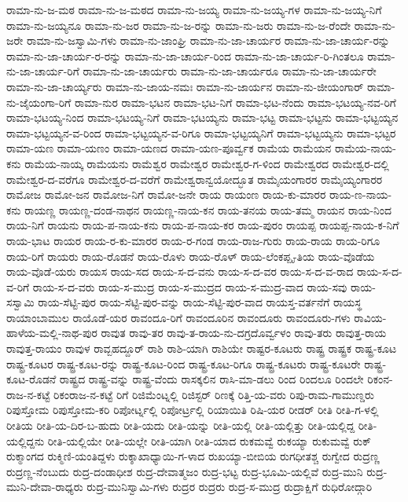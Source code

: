 ರಾಮಾ-ನು-ಜ-ಮಠ
ರಾಮಾ-ನು-ಜ-ಮಠದ
ರಾಮಾ-ನು-ಜಯ್ಯ
ರಾಮಾ-ನು-ಜಯ್ಯ-ಗಳ
ರಾಮಾ-ನು-ಜಯ್ಯ-ನಿಗೆ
ರಾಮಾ-ನು-ಜಯ್ಯನೂ
ರಾಮಾ-ನು-ಜರ
ರಾಮಾ-ನು-ಜ-ರನ್ನು
ರಾಮಾ-ನು-ಜರು
ರಾಮಾ-ನು-ಜ-ರೆಂದೇ
ರಾಮಾ-ನು-ಜರೇ
ರಾಮಾ-ನು-ಜಸ್ವಾಮಿ-ಗಳು
ರಾಮಾ-ನು-ಜಾಂಘ್ರಿ
ರಾಮಾ-ನು-ಜಾ-ಚಾರ್ಯರ
ರಾಮಾ-ನು-ಜಾ-ಚಾರ್ಯ-ರನ್ನು
ರಾಮಾ-ನು-ಜಾ-ಚಾರ್ಯ-ರ-ರನ್ನು
ರಾಮಾ-ನು-ಜಾ-ಚಾರ್ಯ-ರಿಂದ
ರಾಮಾ-ನು-ಜಾ-ಚಾರ್ಯ-ರಿ-ಗಿಂತಲೂ
ರಾಮಾ-ನು-ಜಾ-ಚಾರ್ಯ-ರಿಗೆ
ರಾಮಾ-ನು-ಜಾ-ಚಾರ್ಯರು
ರಾಮಾ-ನು-ಜಾ-ಚಾರ್ಯರೂ
ರಾಮಾ-ನು-ಜಾ-ಚಾರ್ಯರೇ
ರಾಮಾ-ನು-ಜಾ-ಚಾರ್ಯ್ಯರು
ರಾಮಾ-ನು-ಜಾಯ-ನಮಃ
ರಾಮಾ-ನು-ಜಾರ್ಯನ
ರಾಮಾ-ನು-ಜೀಯಂಗಾರ್
ರಾಮಾ-ನು-ಜೈಯಂಗಾ-ರಿಗೆ
ರಾಮಾ-ನುರ
ರಾಮಾ-ಭಟನ
ರಾಮಾ-ಭಟ-ನಿಗೆ
ರಾಮಾ-ಭಟ-ನೆಂದು
ರಾಮಾ-ಭಟಯ್ಯ-ನವ-ರಿಗೆ
ರಾಮಾ-ಭಟಯ್ಯ-ನಿಂದ
ರಾಮಾ-ಭಟಯ್ಯ-ನಿಗೆ
ರಾಮಾ-ಭಟಯ್ಯನು
ರಾಮಾ-ಭಟ್ಟ
ರಾಮಾ-ಭಟ್ಟನು
ರಾಮಾ-ಭಟ್ಟಯ್ಯನ
ರಾಮಾ-ಭಟ್ಟಯ್ಯನ-ವ-ರಿಂದ
ರಾಮಾ-ಭಟ್ಟಯ್ಯನ-ವ-ರಿಗೂ
ರಾಮಾ-ಭಟ್ಟಯ್ಯನಿಗೆ
ರಾಮಾ-ಭಟ್ಟಯ್ಯನು
ರಾಮಾ-ಭಟ್ಟರ
ರಾಮಾ-ಯಣ
ರಾಮಾ-ಯಣಂ
ರಾಮಾ-ಯಣದ
ರಾಮಾ-ಯಣ-ಪೂರ್ವ್ವಕ
ರಾಮೆಯ
ರಾಮೆಯನ
ರಾಮೆಯ-ನಾಯ-ಕನು
ರಾಮೆಯ-ನಾಯ್ಕ
ರಾಮೆಯನು
ರಾಮೆಶ್ವರ
ರಾಮೇಶ್ವರ
ರಾಮೇಶ್ವರ-ಗ-ಳಿಂದ
ರಾಮೇಶ್ವರದ
ರಾಮೇಶ್ವರ-ದಲ್ಲಿ
ರಾಮೇಶ್ವರ-ದ-ವರೆಗೂ
ರಾಮೇಶ್ವರ-ದ-ವರೆಗೆ
ರಾಮೇಶ್ವರಾನ್ವಯೋದ್ಭೂತ
ರಾಮೈಯಂಗಾರರ
ರಾಮೈಯ್ಯಂಗಾರರ
ರಾಮೋಜ
ರಾಮೋ-ಜನ
ರಾಮೋಜ-ನಿಗೆ
ರಾಮೋ-ಜನೇ
ರಾಯ
ರಾಯಂಣ
ರಾಯ-ಕು-ಮಾರರ
ರಾಯ-ಣ-ನಾಯ-ಕನು
ರಾಯಣ್ಣ
ರಾಯಣ್ಣ-ದಂಡ-ನಾಥನ
ರಾಯಣ್ಣ-ನಾಯ-ಕನ
ರಾಯ-ತನಯ
ರಾಯ-ತಮ್ಮ
ರಾಯನ
ರಾಯ-ನಿಂದ
ರಾಯ-ನಿಗೆ
ರಾಯನು
ರಾಯ-ಪ-ನಾಯ-ಕನು
ರಾಯ-ಪ-ನಾಯ-ಕರ
ರಾಯ-ಪುರಂ
ರಾಯಪ್ಪ
ರಾಯಪ್ಪ-ನಾಯ-ಕ-ನಿಗೆ
ರಾಯ-ಭಾಟ
ರಾಯರ
ರಾಯ-ರ-ಕು-ಮಾರರ
ರಾಯ-ರ-ಗಂಡ
ರಾಯ-ರಾಜ-ಗುರು
ರಾಯ-ರಾಯ
ರಾಯ-ರಿಗೂ
ರಾಯ-ರಿಗೆ
ರಾಯರು
ರಾಯ-ರೊಡನೆ
ರಾಯ-ರೊಳು
ರಾಯ-ರೊಳ್
ರಾಯ-ಲೆಂಕಪ್ಪೃ-ತಿಯ
ರಾಯ-ವೊಡೆಯ
ರಾಯ-ವೊಡೆ-ಯರು
ರಾಯಸ
ರಾಯ-ಸದ
ರಾಯ-ಸ-ದ-ವನು
ರಾಯ-ಸ-ದ-ವರ
ರಾಯ-ಸ-ದ-ವ-ರಾದ
ರಾಯ-ಸ-ದ-ವ-ರಿಗೆ
ರಾಯ-ಸ-ದ-ವರು
ರಾಯ-ಸ-ಮುದ್ರ
ರಾಯ-ಸ-ಮುದ್ರದ
ರಾಯ-ಸ-ಮುದ್ರ-ವಾದ
ರಾಯ-ಸವು
ರಾಯ-ಸಸ್ವಾಮಿ
ರಾಯ-ಸೆಟ್ಟಿ-ಪುರ
ರಾಯ-ಸೆಟ್ಟಿ-ಪುರ-ವನ್ನು
ರಾಯ-ಸೆಟ್ಟಿ-ಪುರ-ವಾದ
ರಾಯಸ್ತ-ವರ್ತನೆಗೆ
ರಾಯಸ್ಥ
ರಾಯಾಂಬಾಮುಲ
ರಾಯೊಡೆ-ಯರ
ರಾವಂದೂ-ರಿಗೆ
ರಾವಂದೂರಿನ
ರಾವಂದೂರು
ರಾವಂದೂರು-ಗಳು
ರಾವಿಯ-ಹಾಳೆಯ-ಮಲ್ಲಿ-ನಾಥ-ಪುರ
ರಾವುತ
ರಾವು-ತರ
ರಾವು-ತ-ರಾಯ-ನು-ದಗ್ರದೊರ್ವ್ವಳಂ
ರಾವು-ತರು
ರಾವುತ್ತ-ರಾಯ
ರಾವುತ್ತ-ರಾಯಂ
ರಾವುಳ
ರಾವ್ಬಹದ್ದೂರ್
ರಾಶಿ
ರಾಶಿ-ಯಾಗಿ
ರಾಶಿಯೇ
ರಾಷ್ಟರ-ಕೂಟರು
ರಾಷ್ಟ್ರ
ರಾಷ್ಟ್ರಕ
ರಾಷ್ಟ್ರ-ಕೂಟ
ರಾಷ್ಟ್ರ-ಕೂಟರ
ರಾಷ್ಟ್ರ-ಕೂಟ-ರನ್ನು
ರಾಷ್ಟ್ರ-ಕೂಟ-ರಿಂದ
ರಾಷ್ಟ್ರ-ಕೂಟ-ರಿಗೂ
ರಾಷ್ಟ್ರ-ಕೂಟರು
ರಾಷ್ಟ್ರ-ಕೂಟರೇ
ರಾಷ್ಟ್ರ-ಕೂಟ-ರೊಡನೆ
ರಾಷ್ಟ್ರದ
ರಾಷ್ಟ್ರ-ವನ್ನು
ರಾಷ್ಟ್ರ-ವೆಂದು
ರಾಸಕ್ಕಲಿನ
ರಾಸಿ-ಮಾ-ಡಲು
ರಿಂದ
ರಿಂದಲೂ
ರಿಂದಲೇ
ರಿಕಂನ-ರಾಜ-ನ-ಕಟ್ಟೆ
ರಿಕಂರಾಜ-ನ-ಕಟ್ಟೆ
ರಿಗೆ
ರಿಜಿಮೆಂಟ್ನಲ್ಲಿ
ರಿಜಿಸ್ಟರ್
ರಿಣಕ್ಕೆ
ರಿತ್ತಿ-ಯ-ವರು
ರಿಪು-ರಾಮ-ಗಾಮುಣ್ಡರು
ರಿಪುಸ್ತೋಮ
ರಿಪುಸ್ತೋಮ-ಕರಿ
ರಿಪೋರ್ಟ್ನಲ್ಲಿ
ರಿಪೋರ್ಟ್ರಲ್ಲಿ
ರಿಯಾಯಿತಿ
ರಿಷಿ-ಯರ
ರೀಡರ್
ರೀತಿ
ರೀತಿ-ಗ-ಳಲ್ಲಿ
ರೀತಿಯ
ರೀತಿ-ಯ-ದಿರ-ಬ-ಹುದು
ರೀತಿ-ಯದು
ರೀತಿ-ಯನ್ನು
ರೀತಿ-ಯಲ್ಲಿ
ರೀತಿ-ಯಲ್ಲಿತ್ತು
ರೀತಿ-ಯಲ್ಲಿದ್ದ
ರೀತಿ-ಯಲ್ಲಿದ್ದನು
ರೀತಿ-ಯಲ್ಲಿಯೇ
ರೀತಿ-ಯಲ್ಲೇ
ರೀತಿ-ಯಾಗಿ
ರೀತಿ-ಯಾದ
ರುಕಮವ್ವೆ
ರುಕಯ್ಯಾ
ರುಕುಮವ್ವೆ
ರುಕ್
ರುಕ್ಮಾಂಗದ
ರುಕ್ಮಿಣಿ-ಯಂತಿದ್ದಳು
ರುಕ್ಶಾಖಾಧ್ಯಾಯಿ-ಗ-ಳಾದ
ರುಖಯ್ಯಾ-ಬೀಬಿಯ
ರುಗಧೀತಶ್ಚ
ರುಗ್ವೇದ
ರುದ್ರಣ್ಣ
ರುದ್ರಣ್ಣ-ನೆಂಬುದು
ರುದ್ರ-ದಂಡಾಧೀಶ
ರುದ್ರ-ದೇವಾತ್ಮಜಂ
ರುದ್ರ-ಭಟ್ಟ
ರುದ್ರ-ಭೂಮಿ-ಯಲ್ಲಿವೆ
ರುದ್ರ-ಮುನಿ
ರುದ್ರ-ಮುನಿ-ದೇವಾ-ರಾಧ್ಯರು
ರುದ್ರ-ಮುನಿಸ್ವಾಮಿ-ಗಳು
ರುದ್ರರ
ರುದ್ರರು
ರುದ್ರ-ಸ-ಮುದ್ರ
ರುದ್ರಾಕ್ಷಿಗೆ
ರುಧಿರೋದ್ಗಾರಿ
